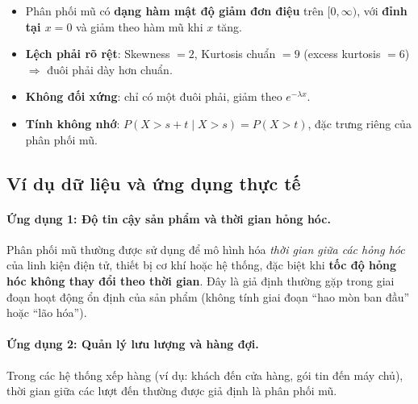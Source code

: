 \documentclass[a4paper,12pt]{article}
\begin{document}
\begin{itemize}
    \item Phân phối mũ có \textbf{dạng hàm mật độ giảm đơn điệu} trên $[0,\infty)$, với \textbf{đỉnh tại $x=0$} và giảm theo hàm mũ khi $x$ tăng.
    \item \textbf{Lệch phải rõ rệt}: Skewness $= 2$, Kurtosis chuẩn $= 9$ (excess kurtosis $= 6$) $\Rightarrow$ đuôi phải dày hơn chuẩn.
    \item \textbf{Không đối xứng}: chỉ có một đuôi phải, giảm theo $e^{-\lambda x}$.
    \item \textbf{Tính không nhớ}: $P(X > s + t \mid X > s) = P(X > t)$, đặc trưng riêng của phân phối mũ.
\end{itemize}

\subsection{Ví dụ dữ liệu và ứng dụng thực tế}

\paragraph{Ứng dụng 1: Độ tin cậy sản phẩm và thời gian hỏng hóc.}  
Phân phối mũ thường được sử dụng để mô hình hóa \textit{thời gian giữa các hỏng hóc} của linh kiện điện tử, thiết bị cơ khí hoặc hệ thống, đặc biệt khi \textbf{tốc độ hỏng hóc không thay đổi theo thời gian}. Đây là giả định thường gặp trong giai đoạn hoạt động ổn định của sản phẩm (không tính giai đoạn “hao mòn ban đầu” hoặc “lão hóa”).

\paragraph{Ứng dụng 2: Quản lý lưu lượng và hàng đợi.}  
Trong các hệ thống xếp hàng (ví dụ: khách đến cửa hàng, gói tin đến máy chủ), thời gian giữa các lượt đến thường được giả định là phân phối mũ.
\end{document}
